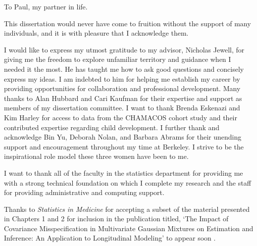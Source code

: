 \documentclass{ucbthesis}
\begin{document}
\begin{frontmatter}

\begin{dedication}
\null\vfil
\begin{center}
To Paul, my partner in life.\\\vspace{12pt}

\end{center}
\vfil\null
\end{dedication}

\begin{KeepFromToc}
  \tableofcontents
\end{KeepFromToc}

\clearpage
\listoffigures
\clearpage
\listoftables

\begin{acknowledgements}
This dissertation would never have come to fruition without the support of many individuals, and it is with pleasure that I acknowledge them.

I would like to express my utmost gratitude to my advisor, Nicholas Jewell, for giving me the freedom to explore unfamiliar territory and guidance when I needed it the most. He has taught me how to ask good questions and concisely express my ideas. I am indebted to him for helping me establish my career by providing opportunities for collaboration and professional development. Many thanks to Alan Hubbard and Cari Kaufman for their expertise and support as members of my dissertation committee. I want to thank Brenda Eskenazi and Kim Harley for access to data from the CHAMACOS cohort study and their contributed expertise regarding child development. I further thank and acknowledge Bin Yu, Deborah Nolan, and Barbara Abrams for their unending support and encouragement throughout my time at Berkeley. I strive to be the inspirational role model these three women have been to me.

I want to thank all of the faculty in the statistics department for providing me with a strong technical foundation on which I complete my research and the staff for providing administrative and computing support. 

Thanks to \emph{Statistics in Medicine} for accepting a subset of the material presented in Chapters 1 and 2 for inclusion in the publication titled, `The Impact of Covariance Misspecification in Multivariate Gaussian Mixtures on Estimation and Inference: An Application to Longitudinal Modeling' to appear soon \cite{heggeseth2013}. 


\end{acknowledgements}
\end{frontmatter}
\end{document}

